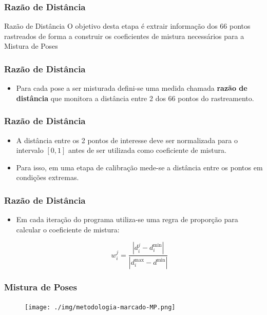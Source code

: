 \documentclass[brazil]{beamer}
\begin{document}
\begin{frame}
\frametitle{Razão de Distância}

\begin{block}{Razão de Distância}
  O objetivo desta etapa é extrair informação dos 66 pontos rastreados de forma
  a construir os coeficientes de mistura necessários para a Mistura de Poses
\end{block}
\end{frame}

\begin{frame}
\frametitle{Razão de Distância}
  \begin{itemize}
       \item Para cada pose a ser misturada defini-se uma medida chamada \textbf{razão de distância} que monitora a distância entre 2 dos 66 pontos do rastreamento.
  \end{itemize} 
\end{frame}

\begin{frame}
\frametitle{Razão de Distância}
  \begin{itemize}
      \item A distância entre os 2 pontos de interesse deve ser normalizada para o intervalo $[0, 1]$ antes de ser utilizada como coeficiente de mistura.

      \item Para isso, em uma etapa de calibração mede-se a distância entre os pontos em
          condições extremas.
  \end{itemize} 
\end{frame}

\begin{frame}
\frametitle{Razão de Distância}
  \begin{itemize}
      \item Em cada iteração do programa utiliza-se uma regra de proporção para
        calcular o coeficiente de mistura:

\begin{equation}
	w_i^j = \frac{|d_i^j - d_i^{\text{min}}|}{|d_i^{\text{max}} - d^{\text{min}}|}
   \label{eq:pesos1}
\end{equation}

  \end{itemize} 
\end{frame}

\begin{frame}
\frametitle{Mistura de Poses}
        \begin{figure}
            \centering
            \texttt{[image: ./img/metodologia-marcado-MP.png]}
      \end{figure}
\end{frame}
\end{document}
